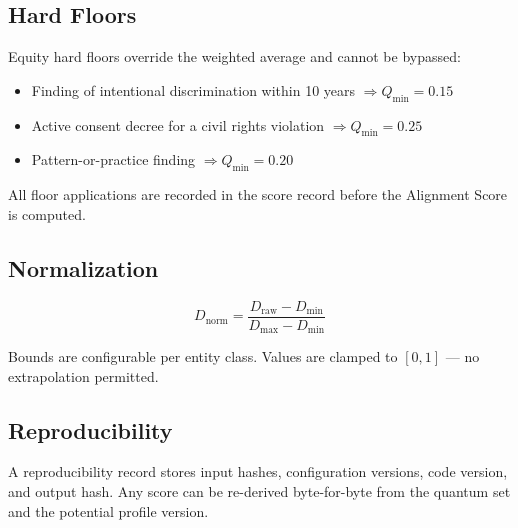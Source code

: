 \subsection{Hard Floors}

Equity hard floors override the weighted average and cannot be bypassed:

\begin{itemize}
  \item Finding of intentional discrimination within 10 years
        \(\Rightarrow Q_{\min} = 0.15\)
  \item Active consent decree for a civil rights violation
        \(\Rightarrow Q_{\min} = 0.25\)
  \item Pattern-or-practice finding \(\Rightarrow Q_{\min} = 0.20\)
\end{itemize}

All floor applications are recorded in the score record before the Alignment
Score is computed.

\subsection{Normalization}

\[
D_{\mathrm{norm}} = \frac{D_{\mathrm{raw}} - D_{\min}}{D_{\max} - D_{\min}}
\]

Bounds are configurable per entity class. Values are clamped to \([0,1]\) ---
no extrapolation permitted.

\subsection{Reproducibility}

A reproducibility record stores input hashes, configuration versions, code
version, and output hash. Any score can be re-derived byte-for-byte from the
quantum set and the potential profile version.
